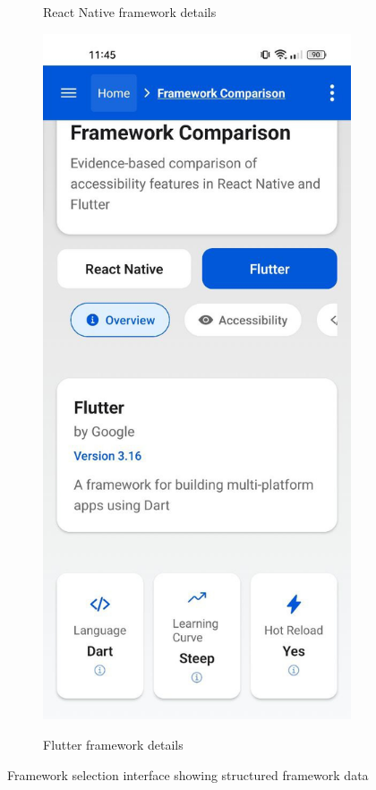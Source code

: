 \begin{figure}[ht]
\begin{subfigure}[b]{0.48\textwidth}
        \caption{React Native framework details}
        \label{fig:react-native-details}
    \end{subfigure}
    \hfill
    \begin{subfigure}[b]{0.48\textwidth}
        \centering
        \includegraphics[width=\linewidth, alt={Flutter framework card showing details}]{img/overview2.jpg}
        \caption{Flutter framework details}
        \label{fig:flutter-details}
    \end{subfigure}
    \caption{Framework selection interface showing structured framework data}
    \label{fig:framework_selection}
\end{figure}

